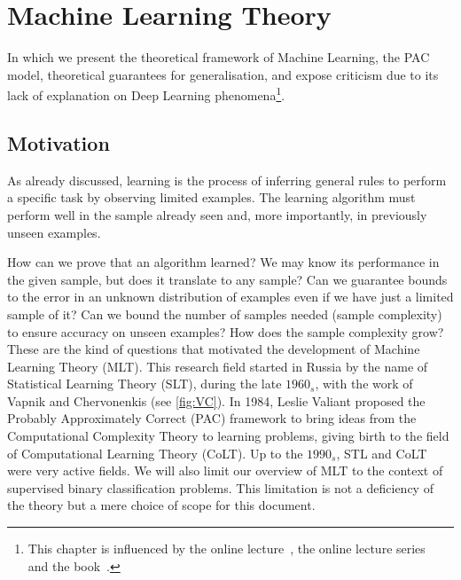 
\chapter{Machine Learning Theory}\label{ch:mlt}


In which we present the theoretical framework of Machine Learning, the PAC model, theoretical guarantees for generalisation, and expose criticism due to its lack of explanation on Deep Learning phenomena\footnote{This chapter is influenced by the online lecture~, the online lecture series~ and the book~. }.

\section{Motivation} As already discussed, learning is the process of inferring general rules to perform a specific task by observing limited examples. The learning algorithm must perform well in the sample already seen and, more importantly, in previously unseen examples.

How can we prove that an algorithm learned? We may know its performance in the given sample, but does it translate to any sample? Can we guarantee bounds to the error in an unknown distribution of examples even if we have just a limited sample of it? Can we bound the number of samples needed (sample complexity) to ensure accuracy on unseen examples? How does the sample complexity grow?
These are the kind of questions that motivated the development of Machine Learning Theory (MLT). This research field started in Russia by the name of Statistical Learning Theory (SLT), during the late \(1960_s\), with the work of Vapnik and Chervonenkis (see \cref{fig:VC}). In 1984, Leslie Valiant proposed the Probably Approximately Correct (PAC) framework to bring ideas from the Computational Complexity Theory to learning problems, giving birth to the field of Computational Learning Theory (CoLT). Up to the \(1990_s\), STL and CoLT were very active fields.
We will also limit our overview of MLT to the context of supervised binary classification problems. This limitation is not a deficiency of the theory but a mere choice of scope for this document.


